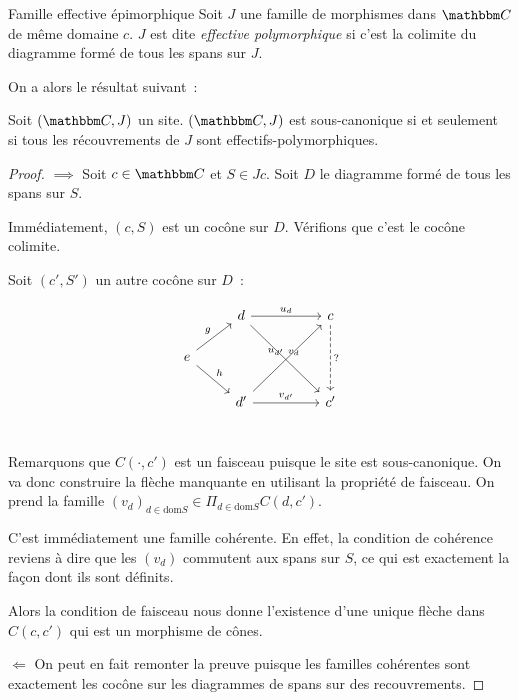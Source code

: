 \begin{defi}{Famille effective épimorphique}
    Soit $J$ une famille de morphismes dans $\C$ de même domaine $c$. $J$ est dite
    \emph{effective polymorphique} si c'est la colimite du diagramme formé de tous
    les spans sur $J$.
\end{defi}

On a alors le résultat suivant~:

\begin{lem}
    Soit $(\C,J)$ un site. $(\C,J)$ est sous-canonique si et seulement si tous les
    récouvrements de $J$ sont effectifs-polymorphiques.
\end{lem}

\begin{proof}
    $\boxed{\implies}$ Soit $c\in \C$ et $S\in Jc$. Soit $D$ le diagramme formé
    de tous les spans sur $S$.

    Immédiatement, $(c,S)$ est un cocône sur $D$. Vérifions que c'est le cocône
    colimite.

    Soit $(c',S')$ un autre cocône sur $D$~:

    \[\begin{tikzcd}
        & d \arrow[rr, "u_d"] \arrow[rrdd, "v_d"] & & c \arrow[dd, dashed, "?"] \\
        e \arrow[ru, "g"] \arrow[rd, "h"] & & & \\
        & d' \arrow[rruu, "u_{d'}"] \arrow[rr, "v_{d'}"] & & c' \\
    \end{tikzcd}\]

    Remarquons que $C(\cdot, c')$ est un faisceau puisque le site est sous-canonique. On
    va donc construire la flèche manquante en utilisant la propriété de faisceau.
    On prend la famille $(v_d)_{d\in\text{dom}S}\in \Pi_{d\in\text{dom}S} C(d,c')$.
    
    C'est immédiatement une famille cohérente. En effet, la condition de cohérence
    reviens à dire que les $(v_d)$ commutent aux spans sur $S$, ce qui est exactement
    la façon dont ils sont définits.

    Alors la condition de faisceau nous donne l'existence d'une unique flèche dans
    $C(c,c')$ qui est un morphisme de cônes.

    $\boxed{\Longleftarrow}$ On peut en fait remonter la preuve puisque les familles 
    cohérentes sont exactement les cocône sur les diagrammes de spans sur des
    recouvrements.
\end{proof}

